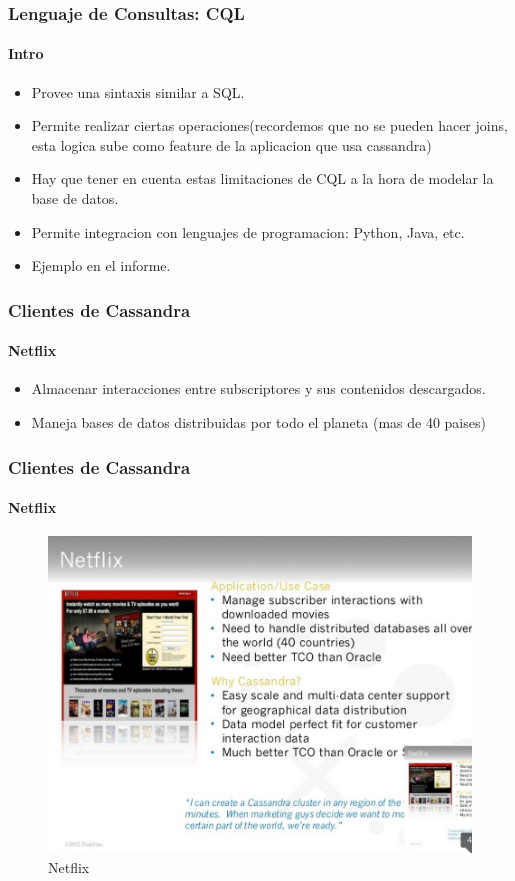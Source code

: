 \documentclass{beamer}
\begin{document}
\begin{frame}
  \frametitle{Lenguaje de Consultas: CQL}
  \framesubtitle{Intro}
   
  \begin{itemize}
    \setlength{\itemsep}{4pt}
    \item Provee una sintaxis similar a SQL.
    \pause
    \item Permite realizar ciertas operaciones(recordemos que no se pueden hacer joins, esta logica sube como feature de la aplicacion que usa cassandra)
    \pause
    \item Hay que tener en cuenta estas limitaciones de CQL a la hora de modelar la base de datos.
    \pause
    \item Permite integracion con lenguajes de programacion: Python, Java, etc.
    \pause
    \item Ejemplo en el informe.
    \end{itemize}
\end{frame}

\begin{frame}
  \frametitle{Clientes de Cassandra}
  \framesubtitle{Netflix}
    \begin{itemize}
    \setlength{\itemsep}{5pt}
    \item Almacenar interacciones entre subscriptores y sus contenidos descargados.
    \pause
    \item Maneja bases de datos distribuidas por todo el planeta (mas de 40 paises)
  \end{itemize}
\end{frame}

\begin{frame}
  \frametitle{Clientes de Cassandra}
  \framesubtitle{Netflix}
   \begin{figure}[h!]
      \centering        
      \includegraphics[scale=0.25]{netflix.jpg}
      \caption{Netflix}
  \end{figure}

\end{frame}
\end{document}
